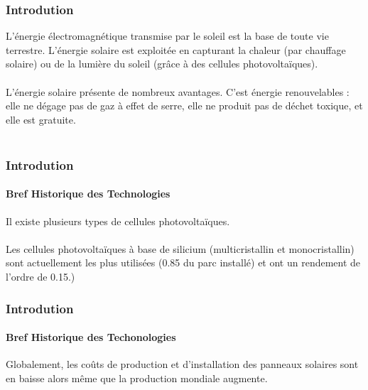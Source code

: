 \documentclass{beamer}
\begin{document}
\begin{frame}
\frametitle{Introdution}

L'énergie électromagnétique transmise par le soleil est la base de toute vie terrestre. L'énergie solaire est exploitée en capturant la chaleur (par chauffage solaire) ou de la lumière du soleil (grâce à des cellules 
photovoltaïques).\\~\\

L’énergie solaire présente de nombreux avantages. C’est énergie renouvelables : elle ne dégage pas de gaz à effet de serre, elle ne produit pas de déchet toxique, et elle est gratuite.\\~\\



\end{frame}
\begin{frame}

\frametitle{Introdution}
\framesubtitle{Bref Historique des Technologies}
Il existe plusieurs types de cellules photovoltaïques.\\~\\
Les cellules photovoltaïques à base de silicium (multicristallin et monocristallin) sont actuellement les plus utilisées (0.85 du parc installé) et ont un rendement de l’ordre de 0.15.)

\begin{figure}
\end{figure}

\end{frame}

\begin{frame}
\frametitle{Introdution}
\framesubtitle{Bref Historique des Techonologies}
Globalement, les coûts de production et d’installation des panneaux solaires sont en baisse alors même que la production mondiale augmente.
\begin{figure}
\end{figure}
\begin{figure}
\end{figure}

\end{frame}
\end{document}
